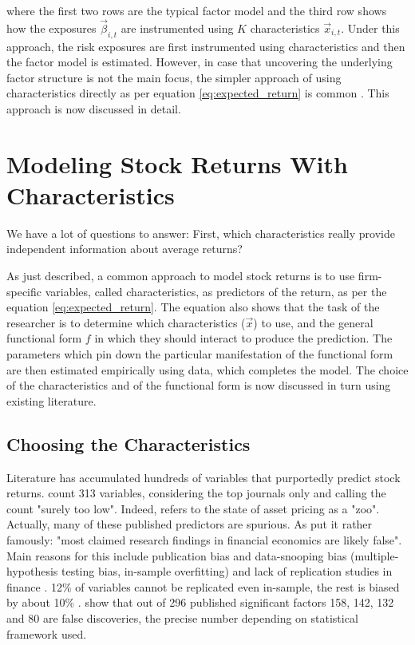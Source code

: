  	where the first two rows are the typical factor model and the third row shows how the exposures $\vec{\beta}_{i,t}$ are instrumented using $K$ characteristics $\vec{x}_{i,t}$. Under this approach, the risk exposures are first instrumented using characteristics and then the factor model is estimated. However, in case that uncovering the underlying factor structure is not the main focus, the simpler approach of using characteristics directly as per equation \ref{eq:expected_return} is common \citep{gu2020empirical, tobek2020does, bryzgalova2019forest}. This approach is now discussed in detail. 
 	
 	
 	\section{Modeling Stock Returns With Characteristics}
	 	
	 	\setlength{\epigraphwidth}{0.8\textwidth}
	 	\epigraph{We have a lot of questions to answer: First, which characteristics really provide	independent information about average returns?}{\cite{cochrane2011presidential}}
			
		As just described, a common approach to model stock returns is to use firm-specific variables, called characteristics, as predictors of the return, as per the equation \ref{eq:expected_return}. The equation also shows that the task of the researcher is to determine which characteristics ($\vec{x}$) to use, and the general functional form $f$ in which they should interact to produce the prediction. The parameters which pin down the particular manifestation of the functional form are then estimated empirically using data, which completes the model. The choice of the characteristics and of the functional form is now discussed in turn using existing literature. 
		
		\subsection{Choosing the Characteristics}	
			
			Literature has accumulated hundreds of variables that purportedly predict stock returns. \cite{harvey2016and} count 313 variables, considering the top journals only and calling the count "surely too low". Indeed, \cite{cochrane2011presidential} refers to the state of asset pricing as a "zoo". Actually, many of these published predictors are spurious. As \cite[p.~5]{harvey2016and} put it rather famously: "most claimed research findings in financial economics are likely false". Main reasons for this include publication bias and data-snooping bias (multiple-hypothesis testing bias, in-sample overfitting) and lack of replication studies in finance \citep{harvey2016and, mclean2016does}. 12\% of variables cannot be replicated even in-sample, the rest is biased by about 10\% \citep{mclean2016does}. \cite{harvey2016and} show that out of 296 published significant factors 158, 142, 132 and 80 are false discoveries, the precise number depending on statistical framework used.
			
